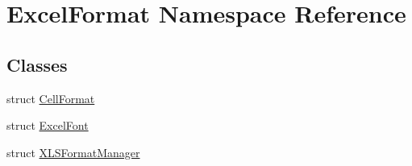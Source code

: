 \hypertarget{namespace_excel_format}{}\section{Excel\+Format Namespace Reference}
\label{namespace_excel_format}
\subsection*{Classes}
\begin{DoxyCompactItemize}
\item 
struct \hyperlink{struct_excel_format_1_1_cell_format}{Cell\+Format}
\item 
struct \hyperlink{struct_excel_format_1_1_excel_font}{Excel\+Font}
\item 
struct \hyperlink{struct_excel_format_1_1_x_l_s_format_manager}{X\+L\+S\+Format\+Manager}
\end{DoxyCompactItemize}
